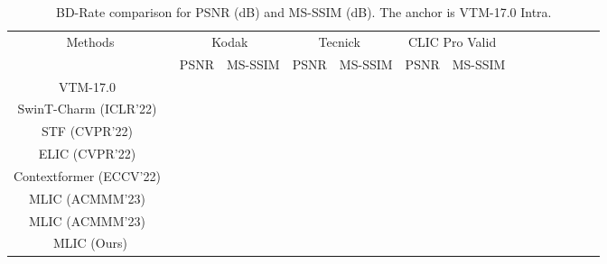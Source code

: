 \documentclass{article}
\theoremstyle{plain}
\theoremstyle{definition}
\theoremstyle{remark}
\begin{document}
  \begin{table*}
      \scriptsize
      \centering
      \begin{tabular}{@{}cccccccccccccc@{}}
      \toprule
      \multicolumn{1}{c|}{\multirow{2}{*}{Methods}}                            & \multicolumn{2}{c}{Kodak}    & \multicolumn{2}{c}{Tecnick~\cite{tecnick2014TESTIMAGES}}  & \multicolumn{2}{c}{CLIC Pro Valid~\cite{CLIC2020}}  \\
      \multicolumn{1}{c|}{}                                                     & \multicolumn{1}{c}{PSNR} & \multicolumn{1}{c}{MS-SSIM}& \multicolumn{1}{c}{PSNR} & \multicolumn{1}{c}{MS-SSIM}& \multicolumn{1}{c}{PSNR} & \multicolumn{1}{c}{MS-SSIM} \\ \midrule
      \multicolumn{1}{c|}{VTM-17.0~\cite{vtm2019}}                                        &        &  &        &  &        &        \\\midrule
      \multicolumn{1}{c|}{SwinT-Charm (ICLR'22)~\cite{zhu2022transformerbased}}                &       &    & & & &   \\\midrule
      \multicolumn{1}{c|}{STF (CVPR'22)~\cite{zou2022the}}         &       &   &       &    &       &       \\\midrule
      \multicolumn{1}{c|}{ELIC (CVPR'22)~\cite{he2022elic}}                             &       &    &       &  &       &    \\\midrule
      \multicolumn{1}{c|}{Contextformer (ECCV'22)~\cite{koyuncu2022contextformer}}        &       &  &       &   &       &      \\\midrule
      \multicolumn{1}{c|}{MLIC (ACMMM'23)~\cite{jiang2022mlic}}                                                    &       &  &       &  &       &     \\\midrule
      \multicolumn{1}{c|}{MLIC (ACMMM'23)~\cite{jiang2022mlic}}                                                &       &     &       &     &       &       \\\midrule
      \multicolumn{1}{c|}{MLIC (Ours)}                                                & \bm{}      & \bm{}  & \bm{} &{}& \bm{}& \bm{}   \\\midrule
      \end{tabular}
      \caption{BD-Rate  comparison for PSNR (dB) and MS-SSIM (dB). The anchor is VTM-17.0 Intra.}
      \label{tab:rd}
    \end{table*}
\end{document}
